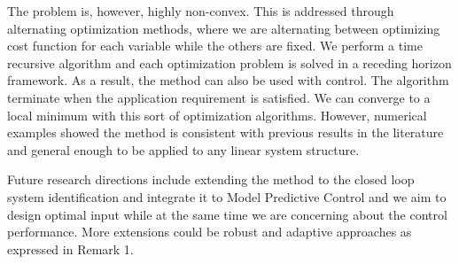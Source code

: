 \documentclass{ifacconf}
\begin{document}
The problem is, however, highly non-convex. This is addressed through alternating optimization methods, where we are alternating between optimizing cost function for each variable while the others are fixed. We perform a time recursive algorithm and each optimization problem is solved in a receding horizon framework. As a result, the method can also be used with control. The algorithm terminate when the application requirement is satisfied. We can converge to a local minimum with this sort of optimization algorithms. However, numerical examples showed the method is consistent with previous results in the literature and general enough to be applied to any linear system structure.

Future research directions include extending the method to the closed loop system identification and integrate it to Model Predictive Control and we aim to design optimal input while at the same time we are concerning about the control performance. More extensions could be robust and adaptive approaches as expressed in Remark 1.




\end{document}

